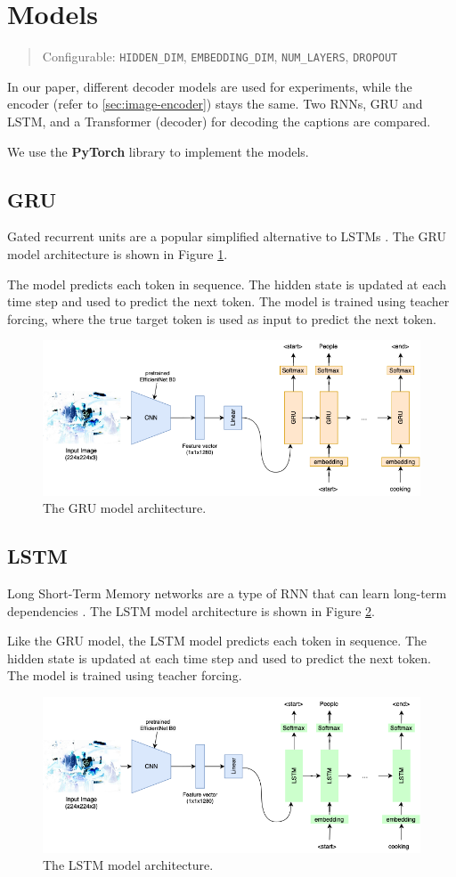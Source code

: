 \documentclass[12pt]{article}
\theoremstyle{plain}
\theoremstyle{definition}
\theoremstyle{remark}
\begin{document}
\section{Models}\label{sec:models}
\begin{quote}\center Configurable: \texttt{HIDDEN\_DIM}, \texttt{EMBEDDING\_DIM}, \texttt{NUM\_LAYERS}, \texttt{DROPOUT}\end{quote}
In our paper, different decoder models are used for experiments, while the encoder (refer to \ref{sec:image-encoder}) stays the same. Two RNNs, GRU and LSTM, and a Transformer (decoder) for decoding the captions are compared.
\par We use the \textbf{PyTorch} library to implement the models.

\subsection{GRU}\label{sec:gru}
Gated recurrent units are a popular simplified alternative to LSTMs \cite{cho2014gru}. The GRU model architecture is shown in Figure \ref{fig:gru}.
\par The model predicts each token in sequence. The hidden state is updated at each time step and used to predict the next token. The model is trained using teacher forcing, where the true target token is used as input to predict the next token.
\begin{figure}[H]
    \centering
    \includegraphics[width=.7\textwidth]{res/gru.png}
    \caption{The GRU model architecture.}\label{fig:gru}
\end{figure}

\subsection{LSTM}\label{sec:lstm}
Long Short-Term Memory networks are a type of RNN that can learn long-term dependencies \cite{hochreiter1997lstm}. The LSTM model architecture is shown in Figure \ref{fig:lstm}.
\par Like the GRU model, the LSTM model predicts each token in sequence. The hidden state is updated at each time step and used to predict the next token. The model is trained using teacher forcing.
\begin{figure}[H]
    \centering
    \includegraphics[width=.7\textwidth]{res/lstm.png}
    \caption{The LSTM model architecture.}\label{fig:lstm}
\end{figure}
\end{document}
